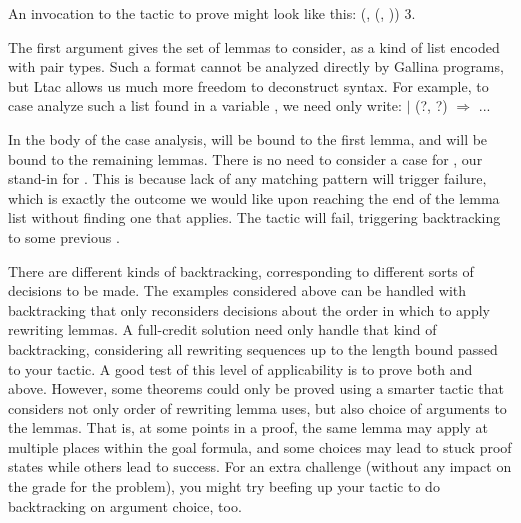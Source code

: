 \documentclass[12pt]{report}
\begin{document}
\begin{enumerate}
An invocation to the tactic to prove  might look like this:
\coqdoceol
\coqdocemptyline
\coqdocindent{1.00em}
 (, (, )) 3.

\coqdocemptyline


The first argument gives the set of lemmas to consider, as a kind of list encoded with pair types.  Such a format cannot be analyzed directly by Gallina programs, but Ltac allows us much more freedom to deconstruct syntax.  For example, to case analyze such a list found in a variable , we need only write:
\coqdoceol
\coqdocemptyline
\coqdocindent{1.00em}
  \coqdoceol
\coqdocindent{2.00em}
\ensuremath{|} (?, ?) \ensuremath{\Rightarrow} ...\coqdoceol
\coqdocindent{1.00em}

\coqdocemptyline


In the body of the case analysis,  will be bound to the first lemma, and  will be bound to the remaining lemmas.  There is no need to consider a case for , our stand-in for .  This is because lack of any matching pattern will trigger failure, which is exactly the outcome we would like upon reaching the end of the lemma list without finding one that applies.  The tactic will fail, triggering backtracking to some previous .


There are different kinds of backtracking, corresponding to different sorts of decisions to be made.  The examples considered above can be handled with backtracking that only reconsiders decisions about the order in which to apply rewriting lemmas.  A full-credit solution need only handle that kind of backtracking, considering all rewriting sequences up to the length bound passed to your tactic.  A good test of this level of applicability is to prove both  and  above.  However, some theorems could only be proved using a smarter tactic that considers not only order of rewriting lemma uses, but also choice of arguments to the lemmas.  That is, at some points in a proof, the same lemma may apply at multiple places within the goal formula, and some choices may lead to stuck proof states while others lead to success.  For an extra challenge (without any impact on the grade for the problem), you might try beefing up your tactic to do backtracking on argument choice, too.


\end{enumerate} 
\end{document}
